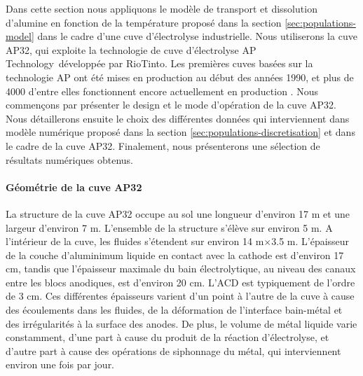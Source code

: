 Dans cette section nous appliquons le modèle de transport et
dissolution d'alumine en fonction de la température proposé dans la
section \ref{sec:populations-model} dans le cadre d'une cuve
d'électrolyse industrielle. Nous utiliserons la cuve AP32, qui
exploite la technologie de cuve d'électrolyse AP
Technology\texttrademark\ développée par RioTinto. Les premières cuves
basées sur la technologie AP ont été mises en production au début des
années 1990, et plus de \num{4000} d'entre elles fonctionnent encore
actuellement en production \cite{RiotintoAP30}. Nous commençons par
présenter le design et le mode d'opération de la cuve AP32. Nous
détaillerons ensuite le choix des différentes données qui
interviennent dans modèle numérique proposé dans la section
\ref{sec:populations-discretisation} et dans le cadre de la cuve
AP32. Finalement, nous présenterons une sélection de résultats
numériques obtenus.



\paragraph{Géométrie de la cuve AP32} La structure de la cuve AP32
occupe au sol une longueur d'environ \num{17} \si{\meter} et une
largeur d'environ \num{7} \si{\meter}. L'ensemble de la structure
s'élève sur environ \num{5} \si{\meter}. A l'intérieur de la cuve, les
fluides s'étendent sur environ
\num{14} \si{\meter}$\times$\num{3.5} \si{\meter}. L'épaisseur de la
couche d'aluminimum liquide en contact avec la cathode est d'environ
\num{17} \si{\centi\meter}, tandis que l'épaisseur maximale du bain
électrolytique, au niveau des canaux entre les blocs anodiques, est
d'environ \num{20} \si{\centi\meter}. L'ACD est typiquement de l'ordre
de \num{3} \si{\centi\meter}. Ces différentes épaisseurs varient d'un
point à l'autre de la cuve à cause des écoulements dans les fluides,
de la déformation de l'interface bain-métal et des irrégularités à la
surface des anodes. De plus, le volume de métal liquide varie
constamment, d'une part à cause du produit de la réaction
d'électrolyse, et d'autre part à cause des opérations de siphonnage du
métal, qui interviennent environ une fois par jour.

